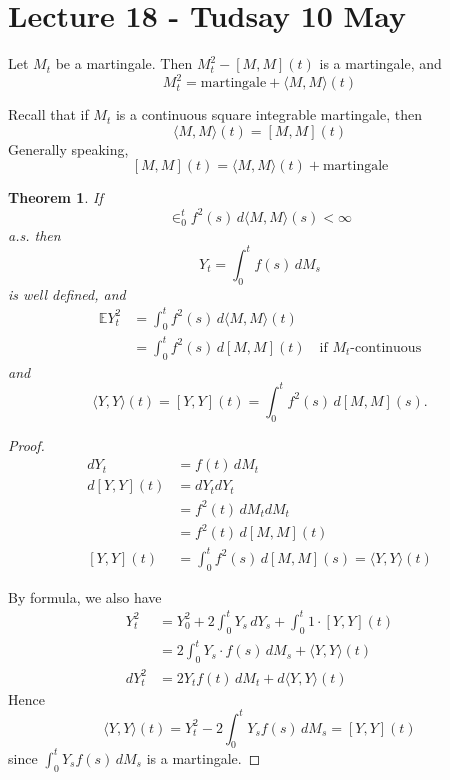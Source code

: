 \documentclass[10pt, oneside, reqno]{amsart}
\theoremstyle{plain}%
\newtheorem{thm}{Theorem}[section]
\theoremstyle{definition}
\theoremstyle{remark}
\newcommand{\E}{\mathbb{E}}
\begin{document}



\section{Lecture 18 - Tudsay 10 May} %
\label{sec:lecture_18_wednesday_10_may}

Let $M_t$ be a martingale.  Then $M_t^2 - [M, M](t)$ is a martingale, and \[
	M_t^2 = \text{martingale} + \langle M, M \rangle(t)
\]

Recall that if $M_t$ is a continuous square integrable martingale, then \[
	\langle M, M \rangle(t) = [M, M](t)
\]  Generally speaking, \[
	[M, M](t) = \langle M, M \rangle (t) + \text{martingale}
\]

\begin{thm}
	 If \[
		\in_0^t f^2(s) \, d\langle M , M \rangle(s) < \infty
	\] a.s. then \[
		Y_t = \int_0^t f(s) \, dM_s
	\] is well defined, and \begin{align*}
		\E Y_t^2 &= \int_0^t f^2(s) \, d\langle M, M \rangle
	(t) \\
	&= \int_0^t f^2(s) \, d[M,M](t) \quad \text{if $M_t$-continuous}
	\end{align*} and \[
		\langle Y, Y \rangle(t) = [Y, Y](t) = \int_0^t f^2(s) \, d[M, M](s).  
	\]
\end{thm} 
\begin{proof}
	\begin{align*}
		dY_t &= f(t) \, dM_t \\
		d[Y, Y](t) &= dY_t dY_t \\
					&= f^2(t) \, dM_t dM_t \\
					 &= f^2(t) \, d[M, M](t) \\
		[Y, Y](t) &= \int_0^t f^2(s) \, d[M, M](s) = \langle Y, Y \rangle(t)  
	\end{align*}
	
	By \itos formula, we also have \begin{align*}
		Y_t^2 &= Y_0^2 + 2 \int_0^t Y_s \, dY_s + \int_0^t 1 \cdot [ Y, Y ](t)  \\
				&= 2 \int_0^t Y_s \cdot f(s) \, dM_s + \langle Y, Y \rangle(t) \\
		dY_t^2		&= 2 Y_t f(t) \, dM_t + d \langle Y, Y \rangle(t)
	\end{align*}  Hence \[
		\langle Y, Y \rangle(t) = Y_t^2 - 2 \int_0^t Y_s f(s) \, dM_s = [Y, Y](t) 
	\] since $\int_0^t Y_s f(s) \, dM_s$ is a martingale.
\end{proof}
\end{document}
